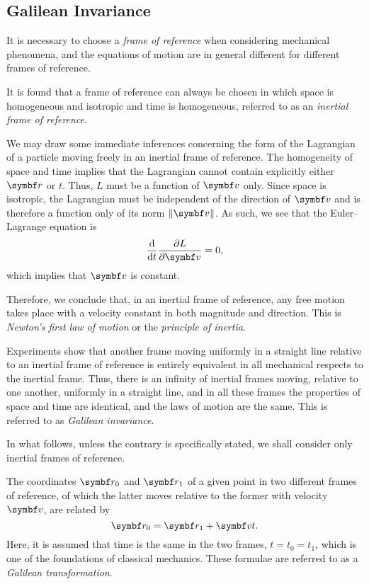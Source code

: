 \subsection{Galilean Invariance}

It is necessary to choose a \emph{frame of reference} when considering mechanical phenomena, and the equations of motion
are in general different for different frames of reference.

It is found that a frame of reference can always be chosen in which space is homogeneous and isotropic and time is
homogeneous, referred to as an \emph{inertial frame of reference}.

We may draw some immediate inferences concerning the form of the Lagrangian of a particle moving freely in an inertial
frame of reference. The homogeneity of space and time implies that the Lagrangian cannot contain explicitly either
\(\vct{r}\) or \(t\). Thus, \(L\) must be a function of \(\vct{v}\) only. Since space is isotropic, the Lagrangian must
be independent of the direction of \(\vct{v}\) and is therefore a function only of its norm \(\norm{\vct{v}}\). As such,
we see that the Euler--Lagrange equation is
\[
  \frac{\diff}{\diff t} \frac{\partial L}{\partial \vct{v}} = 0,
\]
which implies that \(\vct{v}\) is constant.

Therefore, we conclude that, in an inertial frame of reference, any free motion takes place with a velocity constant in
both magnitude and direction. This is \emph{Newton's first law of motion} or the \emph{principle of inertia}.

Experiments show that another frame moving uniformly in a straight line relative to an inertial frame of reference is
entirely equivalent in all mechanical respects to the inertial frame. Thus, there is an infinity of inertial frames
moving, relative to one another, uniformly in a straight line, and in all these frames the properties of space and time
are identical, and the laws of motion are the same. This is referred to as \emph{Galilean invariance}.

In what follows, unless the contrary is specifically stated, we shall consider only inertial frames of reference.

The coordinates \(\vct{r}_0\) and \(\vct{r}_1\) of a given point in two different frames of reference, of which the
latter moves relative to the former with velocity \(\vct{v}\), are related by
\[
  \vct{r}_0 = \vct{r}_1 + \vct{v} t.
\]
Here, it is assumed that time is the same in the two frames, \(t = t_0 = t_1\), which is one of the foundations of
classical mechanics. These formulae are referred to as a \emph{Galilean transformation}.

\Edc
